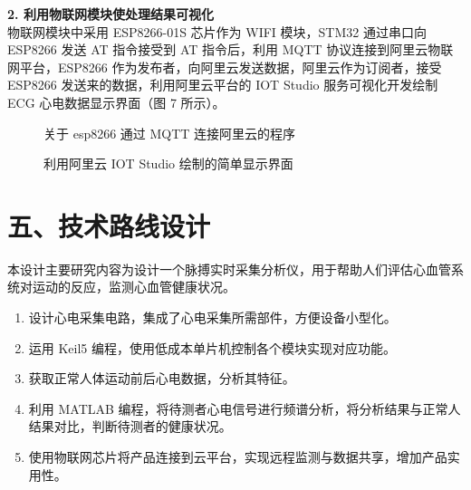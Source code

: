 \documentclass[a4paper,12pt]{article}
\begin{document}
\textbf{2. 利用物联网模块使处理结果可视化}\\
物联网模块中采用 ESP8266-01S 芯片作为 WIFI 模块，STM32 通过串口向 ESP8266 发送 AT 指令接受到 AT 指令后，利用 MQTT 协议连接到阿里云物联网平台，ESP8266 作为发布者，向阿里云发送数据，阿里云作为订阅者，接受 ESP8266 发送来的数据，利用阿里云平台的 IOT Studio 服务可视化开发绘制 ECG 心电数据显示界面（图 7 所示）。

\begin{figure}[H]
    \centering
    \caption{关于 esp8266 通过 MQTT 连接阿里云的程序}
\end{figure}

\begin{figure}[H]
    \centering
    \caption{利用阿里云 IOT Studio 绘制的简单显示界面}
\end{figure}

\section*{五、技术路线设计}
本设计主要研究内容为设计一个脉搏实时采集分析仪，用于帮助人们评估心血管系统对运动的反应，监测心血管健康状况。
\begin{enumerate}
    \item 设计心电采集电路，集成了心电采集所需部件，方便设备小型化。
    \item 运用 Keil5 编程，使用低成本单片机控制各个模块实现对应功能。
    \item 获取正常人体运动前后心电数据，分析其特征。
    \item 利用 MATLAB 编程，将待测者心电信号进行频谱分析，将分析结果与正常人结果对比，判断待测者的健康状况。
    \item 使用物联网芯片将产品连接到云平台，实现远程监测与数据共享，增加产品实用性。
\end{enumerate}
\end{document}
